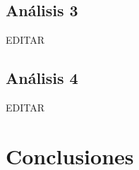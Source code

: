 \documentclass[preprint,12pt]{elsarticle}
\begin{document}
\subsection{\textbf{Análisis 3}}
EDITAR\\

\subsection{\textbf{Análisis 4}}
EDITAR\\




\section{Conclusiones}
\end{document}
